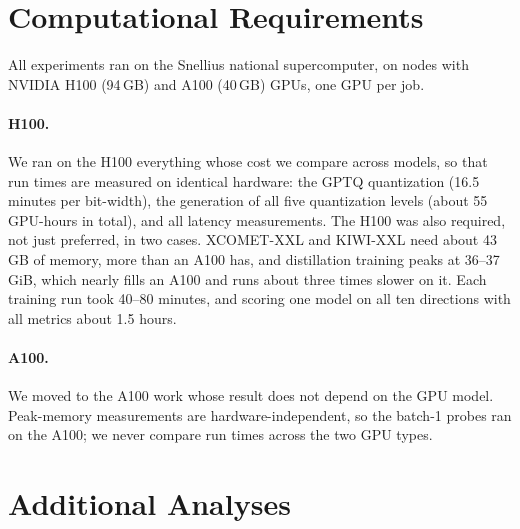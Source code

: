 \documentclass[10pt]{article}
\begin{document}
\section{Computational Requirements}
\label{app:compute}

All experiments ran on the Snellius national supercomputer, on nodes with
NVIDIA H100 (94\,GB) and A100 (40\,GB) GPUs, one GPU per job.

\paragraph{H100.} We ran on the H100 everything whose cost we compare across
models, so that run times are measured on identical hardware: the GPTQ
quantization (16.5 minutes per bit-width), the generation of all five
quantization levels (about 55 GPU-hours in total), and all latency
measurements. The H100 was also required, not just preferred, in two cases.
XCOMET-XXL and KIWI-XXL need about 43\,GB of memory, more than an A100 has, and
distillation training peaks at 36--37\,GiB, which nearly fills an A100 and runs
about three times slower on it. Each training run took 40--80 minutes, and
scoring one model on all ten directions with all metrics about 1.5 hours.

\paragraph{A100.} We moved to the A100 work whose result does not depend on the
GPU model. Peak-memory measurements are hardware-independent, so the batch-1
probes ran on the A100; we never compare run times across the two GPU types.

\section{Additional Analyses}
\label{app:analyses}
\end{document}
